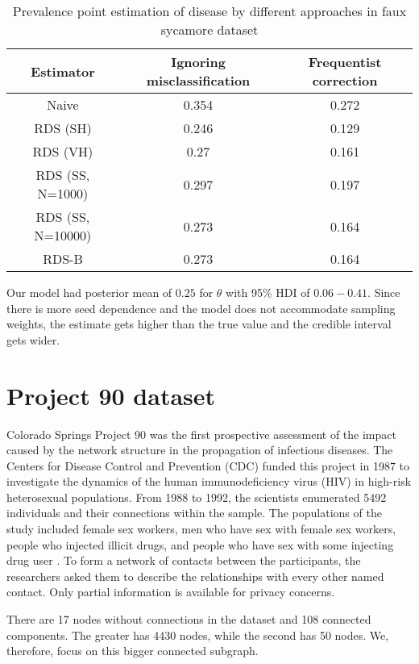 \begin{table}[htbp]
    \centering
    \caption{\label{tab:results-estimators-faux-sycamore-data}Prevalence point estimation of
    disease by different approaches in faux sycamore dataset}
    \begin{tabular}{ccc}
        \hline
        Estimator & Ignoring misclassification & Frequentist correction \\ \hline
        Naive & 0.354 & 0.272 \\
        RDS (SH) & 0.246 & 0.129 \\
        RDS (VH) & 0.27 & 0.161 \\
        RDS (SS, N=1000) & 0.297 & 0.197 \\
        RDS (SS, N=10000) & 0.273 & 0.164 \\
        RDS-B & 0.273 & 0.164 \\ \hline
        \end{tabular}
\end{table}

Our model had posterior mean of $0.25$ for $\theta$ with 95\% HDI of $0.06 -
0.41$. Since there is more seed dependence and the model does not accommodate
sampling weights, the estimate gets higher than the true value and the
credible interval gets wider.

\section{Project 90 dataset}

Colorado Springs Project 90 was the first prospective assessment of the impact
caused by the network structure in the propagation of infectious diseases. The
Centers for Disease Control and Prevention (CDC) funded this project in 1987
to investigate the dynamics of the human immunodeficiency virus (HIV) in
high-risk heterosexual populations. From 1988 to 1992, the scientists
enumerated 5492 individuals and their connections within the sample. The
populations of the study included female sex workers, men who have sex with
female sex workers, people who injected illicit drugs, and people who have sex
with some injecting drug user \cite[p. 1332]{woodhouse1994mapping}. To form a network of contacts between the
participants, the researchers asked them to describe the relationships with
every other named contact. Only partial information is available for privacy
concerns. 

There are 17 nodes without connections in the dataset and 108 connected
components. The greater has 4430 nodes, while the second has 50 nodes. We,
therefore, focus on this bigger connected subgraph. 
